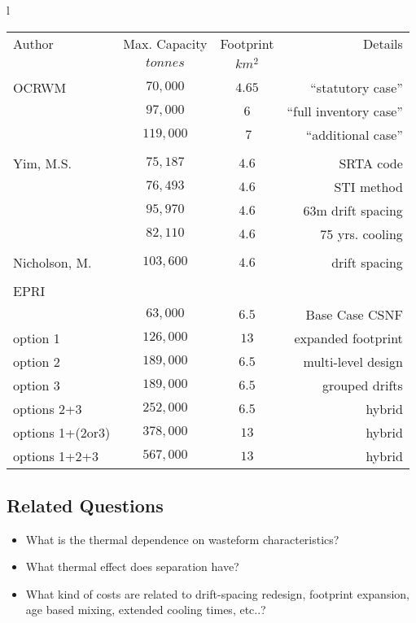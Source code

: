 \begin{centering}
\begin{tabular}{l}
\\
\begin{tabular}{l|c|c|r}
Author&Max. Capacity&Footprint&Details\\
&$tonnes$&$km^2$&\\
\hline
&&&\\
OCRWM&$70,000$&$4.65$&``statutory case''\\
&$97,000$&$6$&``full inventory case''\\
&$119,000$&$~7$&``additional case''\\
\hline
&&&\\
Yim, M.S.&$75,187$&$4.6$&SRTA code\\
&$76,493$&$4.6$&STI method\\
&$95,970$&$4.6$&$63$m drift spacing\\
&$82,110$&$4.6$&75 yrs. cooling\\
\hline
&&&\\
Nicholson, M.&$103,600$&$4.6$&drift spacing\\
\hline
&&&\\
EPRI&&&\\
&$63,000$&$6.5$&Base Case CSNF\\
option 1&$126,000$&$13$&expanded footprint\\
option 2&$189,000$&$6.5$&multi-level design\\
option 3&$189,000$&$6.5$&grouped drifts\\
options 2+3&$252,000$&$6.5$&hybrid\\
options 1+(2or3) &$378,000$&$13$&hybrid\\
options 1+2+3 &$567,000$&$13$&hybrid\\
\hline

\end{tabular}
\end{tabular}
\end{centering}

\subsection{Related Questions}
\begin{itemize}
\item{} What is the thermal dependence on wasteform characteristics?
\item{} What thermal effect does separation have?
\item{} What kind of costs are related to drift-spacing redesign, footprint expansion, age based 
  mixing, extended cooling times, etc..?  \end{itemize}
